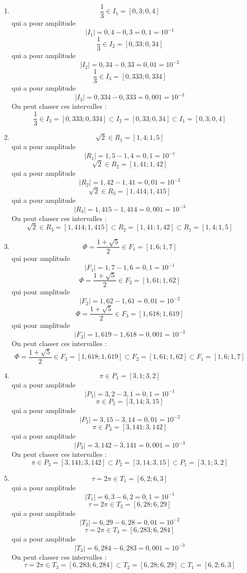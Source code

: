 \documentclass[a4paper, 11pt, twoside]{article}
\begin{document}
\begin{enumerate}
\item \[\dfrac{1}{3}\in I_1 = [0,3 ; 0,4]\] qui a pour amplitude \[|I_1|
      = 0,4 - 0,3 = 0,1 = 10^{-1}\]
\[\dfrac{1}{3}\in I_2 = [0,33 ; 0,34]\] qui a pour amplitude
\[|I_2| = 0,34 - 0,33 = 0,01 = 10^{-2}\]
\[\dfrac{1}{3}\in I_3 = [0,333 ; 0,334]\] qui a pour amplitude
\[|I_3| = 0,334 - 0,333 = 0,001 = 10^{-3}\]
On peut classer ces intervalles :\[\dfrac{1}{3}\in I_3 = [0,333 ;
      0,334] \subset I_2 = [0,33 ; 0,34] \subset I_1 = [0,3 ; 0,4]\]
\item \[\sqrt{2}\in R_1 = [1,4 ; 1,5]\] qui a pour amplitude \[|R_1| =
      1,5 - 1,4 = 0,1 = 10^{-1}\]
\[\sqrt{2}\in R_2 = [1,41 ; 1,42]\] qui a pour amplitude \[|R_2| =
      1,42 - 1,41 = 0,01 = 10^{-2}\]
\[\sqrt{2}\in R_3 = [1,414 ; 1,415]\] qui a pour amplitude \[|R_3|
      = 1,415 - 1,414 = 0,001 = 10^{-3}\]
On peut classer ces intervalles :\[\sqrt{2}\in R_3 = [1,414 ;
      1,415] \subset R_2 = [1,41 ; 1,42]\subset R_1 = [1,4 ; 1,5]\]
\item \[\Phi = \dfrac{1 + \sqrt{5}}{2}\in F_1 = [1,6 ; 1,7]\] qui pour
amplitude \[|F_1| = 1,7 - 1,6 = 0,1 = 10^{-1}\]
\[\Phi = \dfrac{1 + \sqrt{5}}{2}\in F_2 = [1,61 ; 1,62]\] qui pour
amplitude \[|F_2| = 1,62 - 1,61 = 0,01 = 10^{-2}\]
\[\Phi = \dfrac{1 + \sqrt{5}}{2}\in F_3 = [1,618 ; 1,619]\] qui pour
amplitude \[|F_3| = 1,619 - 1,618 = 0,001 = 10^{-3}\]
On peut classer ces intervalles :\[\Phi = \dfrac{1 +
      \sqrt{5}}{2}\in F_3 = [1,618 ; 1,619] \subset F_2 = [1,61 ;
      1,62]\subset F_1 = [1,6 ; 1,7]\]
\item \[\pi\in P_1 = [3,1 ; 3,2]\] qui a pour amplitude \[|P_1| = 3,2 -
      3,1 = 0,1 = 10^{-1}\]
\[\pi\in P_2 = [3,14 ; 3,15]\] qui a pour amplitude \[|P_2| = 3,15 -
      3,14 = 0,01 = 10^{-2}\]
\[\pi\in P_3 = [3,141 ; 3,142]\] qui a pour amplitude \[|P_3| = 3,142 -
      3,141 = 0,001 = 10^{-3}\]
On peut classer ces intervalles : \[\pi\in P_3 = [3,141 ;
      3,142]\subset P_2 = [3,14 ; 3,15]\subset P_1 = [3,1 ; 3,2]\]
\item \[\tau = 2\pi\in T_1 = [6,2 ; 6,3]\] qui a pour amplitude \[|T_1| = 6,3 -
      6,2 = 0,1 = 10^{-1}\]
\[\tau = 2\pi\in T_2 = [6,28 ; 6,29]\] qui a pour amplitude \[|T_2| = 6,29 -
      6,28 = 0,01 = 10^{-2}\]
\[\tau = 2\pi\in T_3 = [6,283 ; 6,284]\] qui a pour amplitude \[|T_3| = 6,284 -
      6,283 = 0,001 = 10^{-3}\]
On peut classer ces intervalles : \[\tau = 2\pi\in T_3 = [6,283 ;
      6,284]\subset T_2 = [6,28 ; 6,29]\subset T_1 = [6,2 ; 6,3]\]
\end{enumerate}
\end{document}
